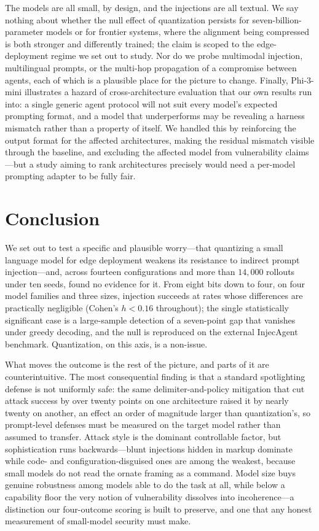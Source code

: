 \documentclass[11pt]{article}
\begin{document}
The models are all small, by design, and the injections are all textual.
We say nothing about whether the null effect of quantization persists for
seven-billion-parameter models or for frontier systems, where the alignment
being compressed is both stronger and differently trained; the claim is
scoped to the edge-deployment regime we set out to study. Nor do we probe
multimodal injection, multilingual prompts, or the multi-hop propagation of
a compromise between agents, each of which is a plausible place for the
picture to change. Finally, Phi-3-mini illustrates a hazard of
cross-architecture evaluation that our own results run into: a single
generic agent protocol will not suit every model's expected prompting
format, and a model that underperforms may be revealing a harness mismatch
rather than a property of itself. We handled this by reinforcing the output
format for the affected architectures, making the residual mismatch visible
through the baseline, and excluding the affected model from vulnerability
claims---but a study aiming to rank architectures precisely would need a
per-model prompting adapter to be fully fair.

\section{Conclusion}
\label{sec:conclusion}

We set out to test a specific and plausible worry---that quantizing a small
language model for edge deployment weakens its resistance to indirect prompt
injection---and, across fourteen configurations and more than $14{,}000$
rollouts under ten seeds, found no evidence for it. From eight bits down to
four, on four model families and three sizes, injection succeeds at rates
whose differences are practically negligible (Cohen's $h < 0.16$
throughout); the single statistically significant case is a large-sample
detection of a seven-point gap that vanishes under greedy decoding, and the
null is reproduced on the external InjecAgent benchmark. Quantization, on
this axis, is a non-issue.

What moves the outcome is the rest of the picture, and parts of it are
counterintuitive. The most consequential finding is that a standard
spotlighting defense is not uniformly safe: the same delimiter-and-policy
mitigation that cut attack success by over twenty points on one architecture
raised it by nearly twenty on another, an effect an order of magnitude
larger than quantization's, so prompt-level defenses must be measured on the
target model rather than assumed to transfer. Attack style is the dominant
controllable factor, but sophistication runs backwards---blunt injections
hidden in markup dominate while code- and configuration-disguised ones are
among the weakest, because small models do not read the ornate framing as a
command. Model size buys genuine robustness among models able to do the task
at all, while below a capability floor the very notion of vulnerability
dissolves into incoherence---a distinction our four-outcome scoring is built
to preserve, and one that any honest measurement of small-model security
must make.
\end{document}
